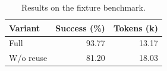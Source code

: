 \begin{table}[t]
\centering
\caption{Results on the fixture benchmark.}
\label{tab:results}
\begin{tabular}{lrr}
\toprule
Variant & Success (\%) & Tokens (k) \\
\midrule
Full & 93.77 & 13.17 \\
W/o reuse & 81.20 & 18.03 \\
\bottomrule
\end{tabular}
\end{table}
